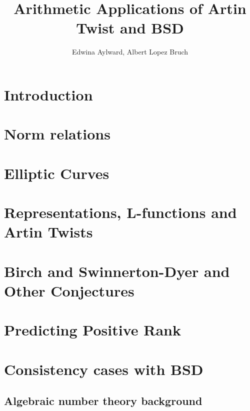 \documentclass{article}
\title{Arithmetic Applications of Artin Twist and BSD}
\author{Edwina Aylward, Albert Lopez Bruch}
\theoremstyle{plain}
\theoremstyle{definition}
\begin{document}
	\maketitle
	\newpage
	\tableofcontents
	\newpage

\section*{Introduction}




\newpage
\section{Norm relations}




\newpage
\section{Elliptic Curves}


\newpage
\section{Representations, L-functions and Artin Twists}


\newpage
\section{Birch and Swinnerton-Dyer and Other Conjectures}


\newpage
\section{Predicting Positive Rank}


\newpage
\section{Consistency cases with BSD}


\newpage
\begin{appendices}
\section{Algebraic number theory background}
%

\end{appendices}

\newpage



\end{document}
